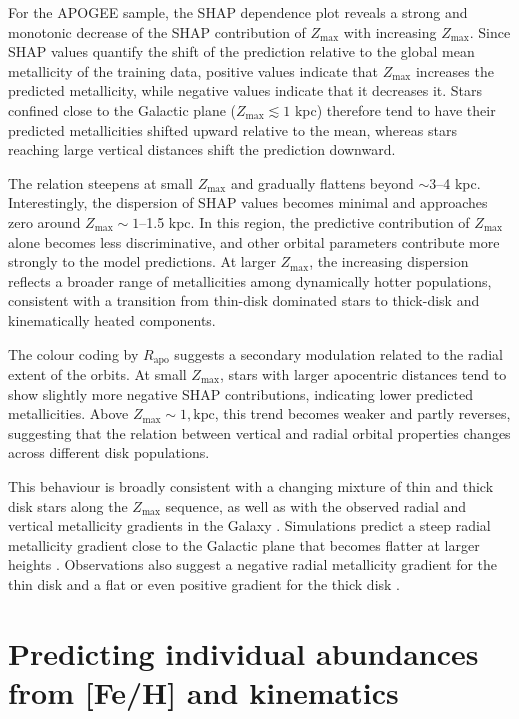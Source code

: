 \documentclass{aa}
\begin{document}
For the APOGEE sample, the SHAP dependence plot reveals a strong and monotonic decrease of the SHAP contribution of $Z_{\max}$ with increasing $Z_{\max}$. Since SHAP values quantify the shift of the prediction relative to the global mean metallicity of the training data, positive values indicate that $Z_{\max}$ increases the predicted metallicity, while negative values indicate that it decreases it. Stars confined close to the Galactic plane ($Z_{\max} \lesssim 1$ kpc) therefore tend to have their predicted metallicities shifted upward relative to the mean, whereas stars reaching large vertical distances shift the prediction downward.

The relation steepens at small $Z_{\max}$ and gradually flattens beyond $\sim$3–4 kpc. Interestingly, the dispersion of SHAP values becomes minimal and approaches zero around $Z_{\max} \sim 1$–1.5 kpc.  In this region, the predictive contribution of $Z_{\mathrm{max}}$ alone becomes less discriminative, and other orbital parameters contribute more strongly to the model predictions. At larger $Z_{\max}$, the increasing dispersion reflects a broader range of metallicities among dynamically hotter populations, consistent with a transition from thin-disk dominated stars to thick-disk and kinematically heated components.

The colour coding by $R_{\mathrm{apo}}$ suggests a secondary modulation related to the radial extent of the orbits. At small $Z_{\max}$, stars with larger apocentric distances tend to show slightly more negative SHAP contributions, indicating lower predicted metallicities. Above $Z_{\max} \sim 1,\mathrm{kpc}$, this trend becomes weaker and partly reverses, suggesting that the relation between vertical and radial orbital properties changes across different disk populations.

This behaviour is broadly consistent with a changing mixture of thin and thick disk stars along the $Z_{\max}$ sequence, as well as with the observed radial and vertical metallicity gradients in the Galaxy \citep{Boeche-13}. Simulations predict a steep radial metallicity gradient close to the Galactic plane that becomes flatter at larger heights \citep{Miranda-16}. Observations also suggest a negative radial metallicity gradient for the thin disk \citep{Katz-21, Imig-23} and a flat or even positive gradient for the thick disk \citep{Recio-Blanco-14, Miranda-16}.


\section{Predicting individual abundances from [Fe/H] and kinematics} \label{abundances_from_feh}
\end{document}
